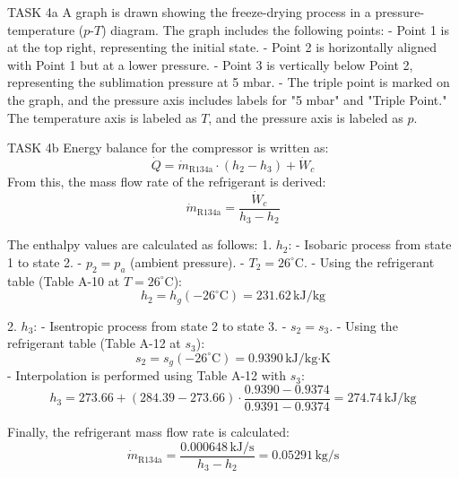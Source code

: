 TASK 4a  
A graph is drawn showing the freeze-drying process in a pressure-temperature (\( p \)-\( T \)) diagram. The graph includes the following points:  
- Point 1 is at the top right, representing the initial state.  
- Point 2 is horizontally aligned with Point 1 but at a lower pressure.  
- Point 3 is vertically below Point 2, representing the sublimation pressure at 5 mbar.  
- The triple point is marked on the graph, and the pressure axis includes labels for "5 mbar" and "Triple Point."  
The temperature axis is labeled as \( T \), and the pressure axis is labeled as \( p \).  

TASK 4b  
Energy balance for the compressor is written as:  
\[
\dot{Q} = \dot{m}_{\text{R134a}} \cdot (h_2 - h_3) + \dot{W}_c
\]  
From this, the mass flow rate of the refrigerant is derived:  
\[
\dot{m}_{\text{R134a}} = \frac{\dot{W}_c}{h_3 - h_2}
\]  

The enthalpy values are calculated as follows:  
1. \( h_2 \):  
   - Isobaric process from state 1 to state 2.  
   - \( p_2 = p_a \) (ambient pressure).  
   - \( T_2 = 26^\circ\text{C} \).  
   - Using the refrigerant table (Table A-10 at \( T = 26^\circ\text{C} \)):  
     \[
     h_2 = h_g(-26^\circ\text{C}) = 231.62 \, \text{kJ/kg}
     \]  

2. \( h_3 \):  
   - Isentropic process from state 2 to state 3.  
   - \( s_2 = s_3 \).  
   - Using the refrigerant table (Table A-12 at \( s_3 \)):  
     \[
     s_2 = s_g(-26^\circ\text{C}) = 0.9390 \, \text{kJ/kg·K}
     \]  
   - Interpolation is performed using Table A-12 with \( s_3 \):  
     \[
     h_3 = 273.66 + (284.39 - 273.66) \cdot \frac{0.9390 - 0.9374}{0.9391 - 0.9374} = 274.74 \, \text{kJ/kg}
     \]  

Finally, the refrigerant mass flow rate is calculated:  
\[
\dot{m}_{\text{R134a}} = \frac{0.000648 \, \text{kJ/s}}{h_3 - h_2} = 0.05291 \, \text{kg/s}
\]